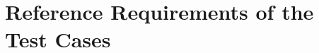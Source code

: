 \clearpage
\appendix
\section{Reference Requirements of the Test Cases}\label{app:references}

\makeatletter
\def\LT@makecaption#1#2#3{\LT@mcol\LT@cols c{\hbox to\z@{\hss\parbox[t]\LTcapwidth{\small{\bfseries #2.} #3\par\vskip\abovecaptionskip}\hss}}}
\makeatother

